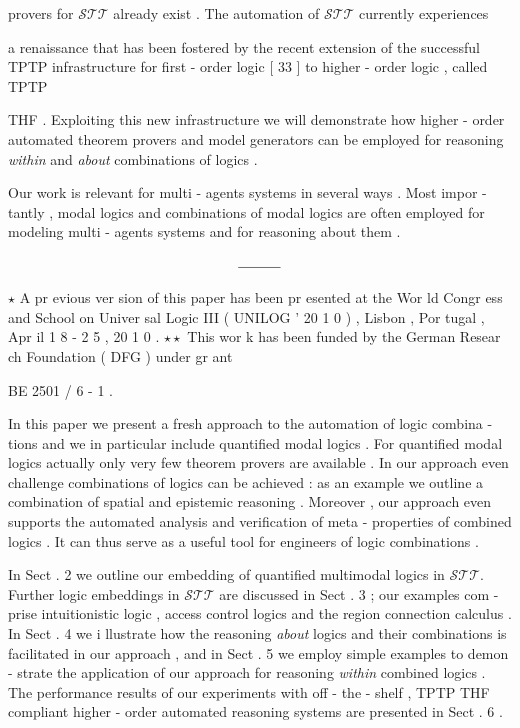 \documentclass[10pt]{article}
\begin{document}
\noindent provers for  $ \mathcal{STT} $  already exist . The automation of  $ \mathcal{STT} $  currently experiences 

\noindent a renaissance that has been fostered by the recent extension of the successful 
 TPTP infrastructure for first - order logic [ 33 ] to higher - order logic , called TPTP 

\noindent THF \quad [ 34 , 35 , 1 5 ] . Exploiting this new infrastructure we will demonstrate how 
 higher - order automated theorem provers and model generators can be employed 
 for reasoning \textit{within } and \textit{about } combinations of logics . 

Our work is relevant for multi - agents systems in several ways . Most impor - 
 tantly , modal logics and combinations of modal logics are often employed for 
 modeling multi - agents systems and for reasoning about them . 

\begin{align*}
 \rule{3em}{0.4pt} 
\end{align*}

 $ \star $  {\small A pr evious ver sion of this paper has been pr esented at the Wor ld Congr ess and } 
 {\small School on Univer sal Logic III ( UNILOG ' 20 1 0 ) , Lisbon , Por tugal , Apr il 1 8 - 2 5 , 20 1 0 . } 
  $ \star  \star $  {\small This wor k has been funded by the German Resear ch Foundation ( DFG ) under gr ant } 

\centerline{{\small BE 2501 / 6 - 1 . } }


\newpage
In this paper we present a fresh approach to the automation of logic combina - 
 tions and we in particular include quantified modal logics . For quantified modal 
 logics actually only very few theorem provers are available . In our approach 
 even challenge combinations of logics can be achieved : as an example we outline 
 a combination of spatial and epistemic reasoning . Moreover , our approach even 
 supports the automated analysis and verification of meta - properties of combined 
 logics . It can thus serve as a useful tool for engineers of logic combinations . 

In Sect . 2 we outline our embedding of quantified multimodal logics in  $ \mathcal{STT}  . $  
 Further logic embeddings in  $ \mathcal{STT} $  are discussed in Sect . 3 ; our examples com - 
 prise intuitionistic logic , access control logics and the region connection calculus . 
 In Sect . 4 we i llustrate how the reasoning \textit{about } logics and their combinations is 
 facilitated in our approach , and in Sect . 5 we employ simple examples to demon - 
 strate the application of our approach for reasoning \textit{within } combined logics . The 
 performance results of our experiments with off - the - shelf , TPTP THF compliant 
 higher - order automated reasoning systems are presented in Sect . 6 . 
\end{document}
